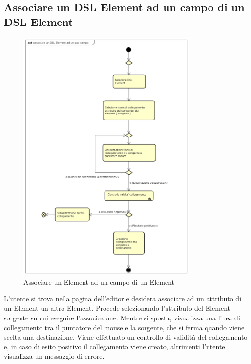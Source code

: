     \subsection{Associare un DSL Element ad un campo di un DSL Element}
    \begin{figure}[H]
      \centering
      \includegraphics[width=0.8\textwidth]{res/img/associazioneDSLElement.png}
      \caption{Associare un  Element ad un campo di un  Element}
      \label{fig:diagram_model}
    \end{figure}
    L'utente si trova nella pagina dell'editor e desidera associare ad un attributo di un  Element un altro  Element. Procede selezionando l'attributo del  Element sorgente su cui eseguire l'associazione. Mentre si sposta, visualizza una linea di collegamento tra il puntatore del mouse e la sorgente, che si ferma quando viene scelta una destinazione. Viene effettuato un controllo di validità del collegamento e, in caso di esito positivo il collegamento viene creato, altrimenti l'utente visualizza un messaggio di errore.
